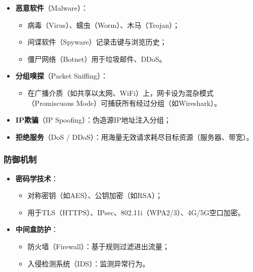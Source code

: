 \begin{itemize}
    \item \textbf{恶意软件}（Malware）：
          \begin{itemize}
              \item 病毒（Virus）、蠕虫（Worm）、木马（Trojan）；
              \item 间谍软件（Spyware）记录击键与浏览历史；
              \item 僵尸网络（Botnet）用于垃圾邮件、DDoS。
          \end{itemize}

    \item \textbf{分组嗅探}（Packet Sniffing）：
          \begin{itemize}
              \item 在广播介质（如共享以太网、WiFi）上，网卡设为混杂模式（Promiscuous Mode）可捕获所有经过分组（如Wireshark）。
          \end{itemize}

    \item \textbf{IP欺骗}（IP Spoofing）：伪造源IP地址注入分组；

    \item \textbf{拒绝服务}（DoS / DDoS）：用海量无效请求耗尽目标资源（服务器、带宽）。
\end{itemize}

\subsubsection{防御机制}

\begin{itemize}
    \item \textbf{密码学技术}：
          \begin{itemize}
              \item 对称密钥（如AES）、公钥加密（如RSA）；
              \item 用于TLS（HTTPS）、IPsec、802.11i（WPA2/3）、4G/5G空口加密。
          \end{itemize}
    \item \textbf{中间盒防护}：
          \begin{itemize}
              \item 防火墙（Firewall）：基于规则过滤进出流量；
              \item 入侵检测系统（IDS）：监测异常行为。
          \end{itemize}
\end{itemize}

